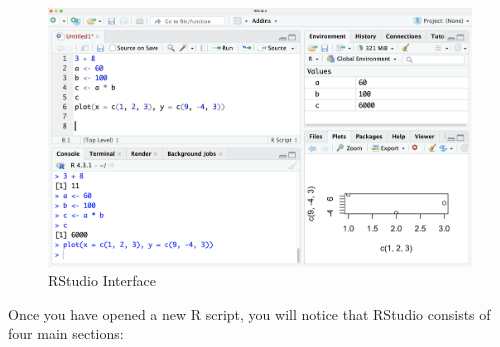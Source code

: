\documentclass[
]{book}
\begin{document}
\begin{figure}
\centering
\includegraphics{files/icons-rstudio/rstudio-rscript-code.png}
\caption{\label{fig:rstudio-rscript-code}RStudio Interface}
\end{figure}

Once you have opened a new R script, you will notice that RStudio consists of four main sections:
\end{document}
